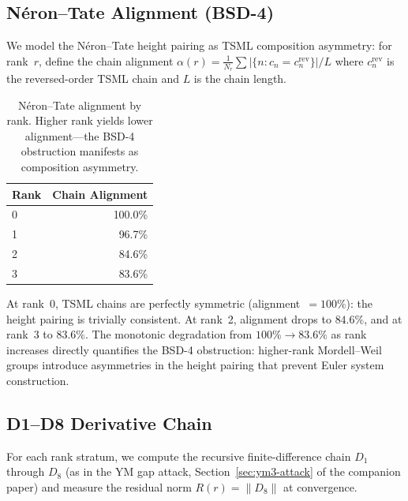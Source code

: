 \documentclass[11pt]{article}
\begin{document}
\subsection{N\'eron--Tate Alignment (BSD-4)}
\label{ssec:bsd34-neron-tate}

We model the N\'eron--Tate height pairing as TSML composition
asymmetry: for rank~$r$, define the chain alignment
$\alpha(r) = \frac{1}{N_r}\sum |\{n : c_n = c_n^{\mathrm{rev}}\}| / L$
where $c_n^{\mathrm{rev}}$ is the reversed-order TSML chain and $L$
is the chain length.

\begin{table}[h]
\centering
\begin{tabular}{l r}
\toprule
Rank & Chain Alignment \\
\midrule
0 & 100.0\% \\
1 &  96.7\% \\
2 &  84.6\% \\
3 &  83.6\% \\
\bottomrule
\end{tabular}
\caption{N\'eron--Tate alignment by rank.  Higher rank yields lower
alignment---the BSD-4 obstruction manifests as composition asymmetry.}
\label{tab:neron-tate-alignment}
\end{table}

At rank~0, TSML chains are perfectly symmetric (alignment~$= 100\%$):
the height pairing is trivially consistent.  At rank~2, alignment
drops to $84.6\%$, and at rank~3 to $83.6\%$.  The monotonic
degradation from $100\% \to 83.6\%$ as rank increases directly
quantifies the BSD-4 obstruction: higher-rank Mordell--Weil groups
introduce asymmetries in the height pairing that prevent Euler system
construction.

\subsection{D1--D8 Derivative Chain}
\label{ssec:bsd34-derivative-chain}

For each rank stratum, we compute the recursive finite-difference
chain $D_1$ through $D_8$ (as in the YM gap attack,
Section~\ref{sec:ym3-attack} of the companion paper) and measure
the residual norm $R(r) = \|D_8\|$ at convergence.
\end{document}
